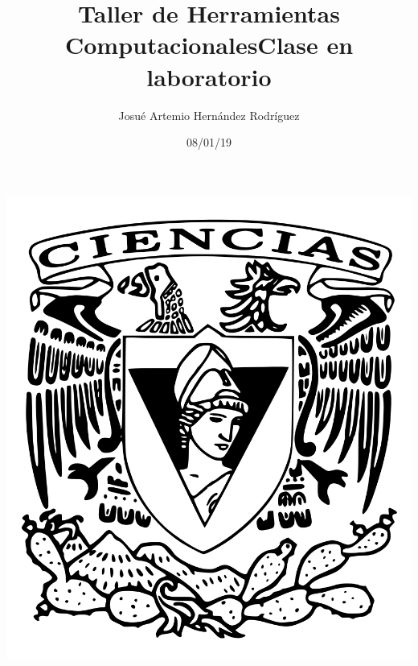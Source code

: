 \documentclass[letterpaper, 12pt, oneside]{article}%
\title{\Huge Taller de Herramientas Computacionales}
\author{Josué Artemio Hernández Rodríguez}%
\date{08/01/19}%
\begin{document}
\maketitle
\begin{center}%
\includegraphics[scale=0.2]{2.png}%
\end{center}%
\newpage%

\title{\Huge Clase en laboratorio\\}%
\end{document}
